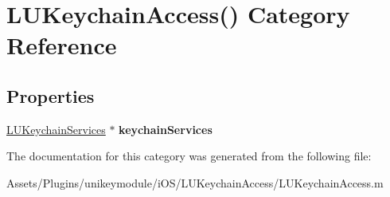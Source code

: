 \hypertarget{category_l_u_keychain_access_07_08}{}\section{L\+U\+Keychain\+Access() Category Reference}
\label{category_l_u_keychain_access_07_08}
\subsection*{Properties}
\begin{DoxyCompactItemize}
\item 
\mbox{\label{category_l_u_keychain_access_07_08_abacce8eac8ea9d7ae7e85cf0a1ba15e7}} 
\mbox{\hyperlink{interface_l_u_keychain_services}{L\+U\+Keychain\+Services}} $\ast$ {\bfseries keychain\+Services}
\end{DoxyCompactItemize}


The documentation for this category was generated from the following file\+:\begin{DoxyCompactItemize}
\item 
Assets/\+Plugins/unikeymodule/i\+O\+S/\+L\+U\+Keychain\+Access/L\+U\+Keychain\+Access.\+m\end{DoxyCompactItemize}
